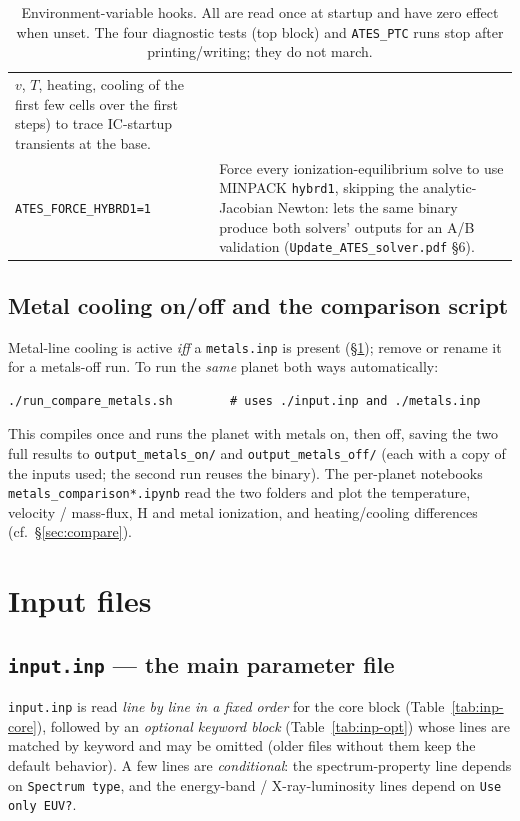 \documentclass[english,a4paper]{kiseon_memo}
\begin{document}
\begin{table}[htbp]
\begin{tabular}{@{}lp{10.2cm}@{}}
  $v$, $T$, heating, cooling of the first few cells over the first steps) to
  trace IC-startup transients at the base. \\
\texttt{ATES\_FORCE\_HYBRD1=1} & Force every ionization-equilibrium solve to
  use MINPACK \texttt{hybrd1}, skipping the analytic-Jacobian Newton: lets the
  same binary produce both solvers' outputs for an A/B validation
  (\texttt{Update\_ATES\_solver.pdf} \S6). \\
\bottomrule
\end{tabular}
\caption{Environment-variable hooks. All are read once at startup and have
zero effect when unset. The four diagnostic tests (top block) and
\texttt{ATES\_PTC} runs stop after printing/writing; they do not march.}
\label{tab:env}
\end{table}

\subsection{Metal cooling on/off and the comparison script}
Metal-line cooling is active \emph{iff} a \texttt{metals.inp} is present
(\S\ref{sec:inputs}); remove or rename it for a metals-off run. To run the
\emph{same} planet both ways automatically:
\begin{lstlisting}[style=sh]
./run_compare_metals.sh        # uses ./input.inp and ./metals.inp
\end{lstlisting}
This compiles once and runs the planet with metals on, then off, saving the two
full results to \texttt{output\_metals\_on/} and \texttt{output\_metals\_off/}
(each with a copy of the inputs used; the second run reuses the binary). The
per-planet notebooks \texttt{metals\_comparison*.ipynb} read the two folders and
plot the temperature, velocity / mass-flux, H and metal ionization, and
heating/cooling differences (cf.\ \S\ref{sec:compare}).

\section{Input files}\label{sec:inputs}

\subsection{\texttt{input.inp} --- the main parameter file}
\texttt{input.inp} is read \emph{line by line in a fixed order} for the core
block (Table~\ref{tab:inp-core}), followed by an \emph{optional keyword block}
(Table~\ref{tab:inp-opt}) whose lines are matched by keyword and may be omitted
(older files without them keep the default behavior). A few lines are
\emph{conditional}: the spectrum-property line depends on \texttt{Spectrum type},
and the energy-band / X-ray-luminosity lines depend on \texttt{Use only EUV?}.
\end{document}
